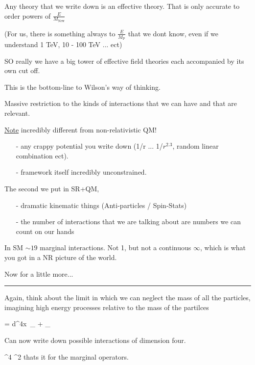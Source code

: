 {Any theory that we write down is an effective theory. 
That is only accurate to order powers of $\frac{E}{M_\textrm{New}}$

(For us, there is something always to $\frac{E}{M_\textrm{P}}$ that we dont know, even if we understand 1 TeV, 10 - 100 TeV ... ect)

SO really we have a big tower of effective field theories each accompanied by its own cut off. 

This is the bottom-line to Wilson's  way of thinking. 

Massive restriction to the kinds of interactions that we can have and that are relevant. 

\underline{Note} incredibly different from non-relativistic QM! 
\begin{itemize}
\item[-]any crappy potential you write down (1/r ... 1/$r^{2.3}$, random linear combination ect). 
\item[-]framework itself incredibly unconstrained.
\end{itemize}

The second we put in SR+QM, 
\begin{itemize}
\item[-] dramatic kinematic things (Anti-particles / Spin-Stats) 
\item[-] the number of interactions that we are talking about are numbers we can count on our hands
\end{itemize}

In SM $\sim 19$ marginal interactions. 
Not 1, but not a continuous $\infty$, which is what you got in a NR picture of the world.

Now for a little more...

\noindent\rule{\textwidth}{1pt}

Again, think about the limit in which we can neglect the mass of all the particles, imagining high energy processes relative to the mass of the partilces

\be
= \int d^4x\ \underbrace{(\partial_\mu\phi)(\partial^\mu\phi)}_{} + _{}
\ee

Can now write down possible interactions of dimension four. 

\be
\Phi^4 \hspace{1in} \Phi^2\partial\Phi \hspace{1in} \psi\psi\Phi
\ee 
thats it for the marginal operators.


}
